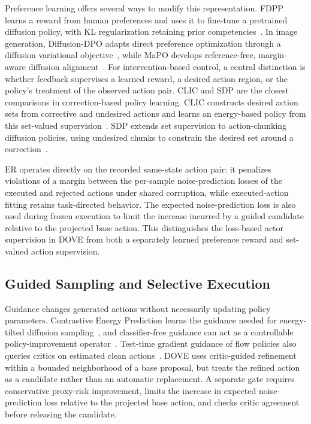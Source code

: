 \documentclass[9pt,journal]{IEEEtran}
\newcommand{\DOVE}{DOVE}
\newcommand{\ER}{\ensuremath{\mathrm{ER}}}
\begin{document}
Preference learning offers several ways to modify this representation.
FDPP learns a reward from human preferences and uses it to fine-tune a
pretrained diffusion policy, with KL regularization retaining prior
competencies~\cite{chen2025fdpp}. In image generation, Diffusion-DPO
adapts direct preference optimization through a diffusion variational
objective~\cite{wallace2024diffusiondpo}, while MaPO develops
reference-free, margin-aware diffusion alignment~\cite{hong2026mapo}.
For intervention-based control, a central distinction is whether feedback
supervises a learned reward, a desired action region, or the policy's
treatment of the observed action pair.
CLIC and SDP are the closest comparisons in correction-based policy
learning. CLIC constructs desired action sets from corrective and
undesired actions and learns an energy-based policy from this set-valued
supervision~\cite{li2025clic}. SDP extends set supervision to
action-chunking diffusion policies, using undesired chunks to constrain
the desired set around a correction~\cite{li2026sdp}.

\ER{} operates directly on the recorded same-state action pair:
it penalizes violations of a margin between the per-sample
noise-prediction losses of the executed and rejected actions under
shared corruption, while executed-action fitting retains
task-directed behavior. The expected noise-prediction loss is also
used during frozen execution to limit the increase incurred by
a guided candidate relative to the projected base action.
This distinguishes the loss-based actor supervision in \DOVE{}
from both a separately learned preference reward and set-valued
action supervision.

\subsection{Guided Sampling and Selective Execution}

Guidance changes generated actions without necessarily updating policy
parameters. Contrastive Energy Prediction learns the guidance needed for
energy-tilted diffusion sampling~\cite{lu2023cep}, and classifier-free
guidance can act as a controllable policy-improvement
operator~\cite{frans2025guidance}. Test-time gradient guidance of flow
policies also queries critics on estimated clean
actions~\cite{zhou2026qgf}.
\DOVE{} uses critic-guided refinement within a bounded neighborhood of a
base proposal, but treats the refined action as a candidate rather than
an automatic replacement. A separate gate requires conservative proxy-risk improvement, limits the increase in expected noise-prediction loss relative to
the projected base action, and checks critic agreement before
releasing the candidate.
\end{document}
